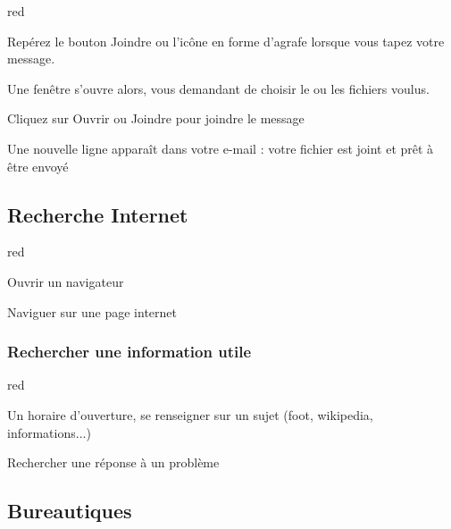 \begin{items}{red}{\Circle}

\item Repérez le bouton Joindre ou l’icône en forme d’agrafe lorsque vous tapez votre message.
\item Une fenêtre s’ouvre alors, vous demandant de choisir le ou les fichiers voulus.
\item Cliquez sur Ouvrir ou Joindre pour joindre le message

Une nouvelle ligne apparaît dans votre e-mail : votre fichier est joint et prêt à être envoyé

\end{items}






\subsection{Recherche Internet}
\begin{items}{red}{\Circle}
\item Ouvrir un navigateur
\item Naviguer sur une page internet
\end{items}

\subsubsection{Rechercher une information utile}
\begin{items}{red}{\Circle}

\item Un horaire d'ouverture, se renseigner sur un sujet (foot, wikipedia, informations...)
\item Rechercher une réponse à un problème

\end{items}

\newpage

\subsection{Bureautiques}



